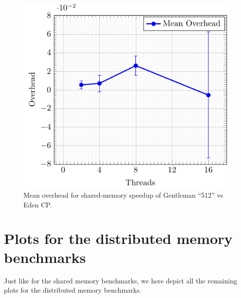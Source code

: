 \documentclass[paper=A4,twoside=true,openright,parskip=full,chapterprefix=true,headings=normal,bibliography=totoc,listof=totoc,titlepage=on,captions=tableabove,draft=false,british]{scrreprt}%
\renewcommand{\enquote}[1]{{``}#1{''}}
\begin{document}
\begin{figure}[h]
\centering
\includegraphics{src/img/overSMTorusEden.pdf}
\caption{Mean overhead for shared-memory speedup of Gentleman
\enquote{512} vs Eden CP.\label{fig:overSMTorusEden}}
\end{figure}

\hypertarget{plots-for-the-distributed-memory-benchmarks}{%
\section{Plots for the distributed memory
benchmarks}\label{plots-for-the-distributed-memory-benchmarks}}

\label{sec:benchmarkDistPlots}

Just like for the shared memory benchmarks, we here depict all the
remaining plots for the distributed memory benchmarks.

\vfill
\end{document}
